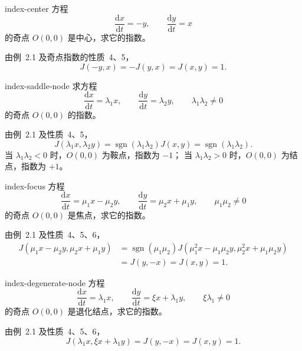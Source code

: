 \begin{example}{}{index-center}
方程
\[
  \dfrac{\mathrm{d}x}{\mathrm{d}t}=-y,\qquad
  \dfrac{\mathrm{d}y}{\mathrm{d}t}=x
\]
的奇点 $O(0,0)$ 是中心，求它的指数。

\begin{solution}
由例~2.1 及奇点指数的性质~4、5，
\[
  J(-y,x)=-J(y,x)=J(x,y)=1.
\]
\end{solution}
\end{example}

\begin{example}{}{index-saddle-node}
求方程
\[
  \dfrac{\mathrm{d}x}{\mathrm{d}t}=\lambda_1x,\qquad
  \dfrac{\mathrm{d}y}{\mathrm{d}t}=\lambda_2y,\qquad
  \lambda_1\lambda_2\ne0
\]
的奇点 $O(0,0)$ 的指数。

\begin{solution}
由例~2.1 及性质~4、5，
\[
  J(\lambda_1x,\lambda_2y)
  =\operatorname{sgn}(\lambda_1\lambda_2)J(x,y)
  =\operatorname{sgn}(\lambda_1\lambda_2).
\]
当 $\lambda_1\lambda_2<0$ 时，$O(0,0)$ 为鞍点，指数为 $-1$；
当 $\lambda_1\lambda_2>0$ 时，$O(0,0)$ 为结点，指数为 $+1$。
\end{solution}
\end{example}

\begin{example}{}{index-focus}
方程
\[
  \dfrac{\mathrm{d}x}{\mathrm{d}t}=\mu_1x-\mu_2y,\qquad
  \dfrac{\mathrm{d}y}{\mathrm{d}t}=\mu_2x+\mu_1y,\qquad
  \mu_1\mu_2\ne0
\]
的奇点 $O(0,0)$ 是焦点，求它的指数。

\begin{solution}
由例~2.1 及性质~4、5、6，
\begin{align*}
  J(\mu_1x-\mu_2y,\mu_2x+\mu_1y)
  &=\operatorname{sgn}(\mu_1\mu_2)
    J(\mu_1^2x-\mu_1\mu_2y,\mu_2^2x+\mu_1\mu_2y)\\
  &=J(y,-x)=J(x,y)=1.
\end{align*}
\end{solution}
\end{example}

\begin{example}{}{index-degenerate-node}
方程
\[
  \dfrac{\mathrm{d}x}{\mathrm{d}t}=\lambda_1x,\qquad
  \dfrac{\mathrm{d}y}{\mathrm{d}t}=\xi x+\lambda_1y,\qquad
  \xi\lambda_1\ne0
\]
的奇点 $O(0,0)$ 是退化结点，求它的指数。

\begin{solution}
由例~2.1 及性质~4、5、6，
\[
  J(\lambda_1x,\xi x+\lambda_1y)=J(y,-x)=J(x,y)=1.
\]
\end{solution}
\end{example}

